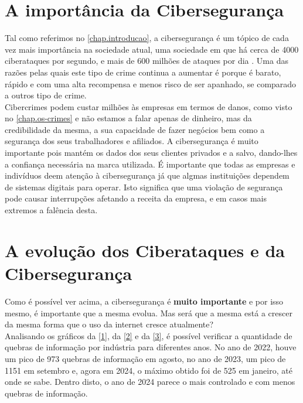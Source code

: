 \documentclass{report}
\begin{document}
\section{A importância da Cibersegurança}
Tal como referimos no \autoref{chap.introducao}, a cibersegurança é um tópico de cada vez mais importância na sociedade atual, uma sociedade em que há cerca de 4000 ciberataques por segundo, e mais de 600 milhões de ataques por dia \cite{ataques}. Uma das razões pelas quais este tipo de crime continua a aumentar é porque é barato, rápido e com uma alta recompensa e menos risco de ser apanhado, se comparado a outros tipo de crime. \\ \indent Cibercrimes podem custar milhões às empresas em termos de danos, como visto no \autoref{chap.os-crimes} e não estamos a falar apenas de dinheiro, mas da credibilidade da mesma, a sua capacidade de fazer negócios bem como a segurança dos seus trabalhadores e afiliados. A cibersegurança é muito importante pois mantém os dados dos seus clientes privados e a salvo, dando-lhes a confiança necessária na marca utilizada.
É importante que todas as empresas e indivíduos deem atenção à cibersegurança já que algmas instituições dependem de sistemas digitais para operar. Isto significa que uma violação de segurança pode causar interrupções afetando a receita da empresa, e em casos mais extremos a falência desta.
\section{A evolução dos Ciberataques e da Cibersegurança}

Como é possível ver acima, a cibersegurança é \textbf{muito importante} e por isso mesmo, é importante que a mesma evolua. Mas será que a mesma está a crescer da mesma forma que o uso da internet cresce atualmente?
\\ \indent Analisando os gráficos da \autoref{1}, da \autoref{2} e da \autoref{3}, é possível verificar a quantidade de quebras de informação por indústria para diferentes anos. No ano de 2022, houve um pico de 973 quebras de informação em agosto, no ano de 2023, um pico de 1151 em setembro e, agora em 2024, o máximo obtido foi de 525  em janeiro, até onde se sabe.
Dentro disto, o ano de 2024 parece o mais controlado e com menos quebras de informação. \\ \indent
\end{document}
